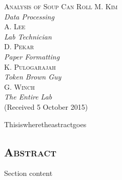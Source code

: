 \documentclass[12pt,notitlepage,twoside,draft]{article}
\begin{document}
  

\begin{center}
\huge
\textsc{Analysis of Soup Can Roll}
{\large\centering
\newline
\newline
\textsc{M. Kim\\}
\textit{\footnotesize Data Processing\\}
\large
\textsc{A. Lee\\}
\textit{\footnotesize Lab Technician\\}
\large
\textsc{D. Pekar\\}
\textit{\footnotesize Paper Formatting\\}
\large
\textsc{K. Pulogarajah\\}
\textit{\footnotesize Token Brown Guy\\}
\large
\textsc{G. Winch\\}
\textit{\footnotesize The Entire Lab\\}
\vspace{3mm}
\footnotesize
(Received 5 October 2015)\\}
\end{center}

\footnotesize
Thisiswheretheastractgoes
\large
\begin{multicols}{2}
\begin{center}
\section{\textsc{Abstract}}
\end{center}
Section content


\end{multicols}
\end{document}
